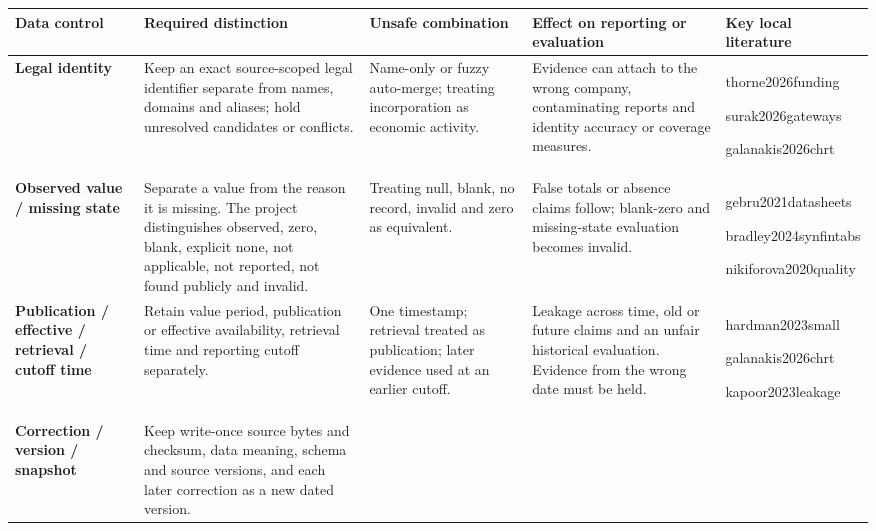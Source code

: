 \clearpage
\begin{table}[p]
  \centering
  \footnotesize
  \setlength{\tabcolsep}{2.2pt}
  \renewcommand{\arraystretch}{1.16}
  \begin{tabularx}{\textwidth}{@{}P{0.15\textwidth}P{0.24\textwidth}P{0.19\textwidth}Y>{\RaggedRight\arraybackslash\scriptsize}p{0.14\textwidth}@{}}
    \toprule
    \textbf{Data control} &
    \textbf{Required distinction} &
    \textbf{Unsafe combination} &
    \textbf{Effect on reporting or evaluation} &
    {\footnotesize\textbf{Key local literature}} \\
    \midrule
    \textbf{Legal identity} &
    Keep an exact source-scoped legal identifier separate from names, domains and aliases; hold unresolved candidates or conflicts. &
    Name-only or fuzzy auto-merge; treating incorporation as economic activity. &
    Evidence can attach to the wrong company, contaminating reports and identity accuracy or coverage measures. &
    thorne2026\allowbreak funding\par surak2026\allowbreak gateways\par galanakis2026\allowbreak chrt \\
    \addlinespace
    \textbf{Observed value / missing state} &
    Separate a value from the reason it is missing. The project distinguishes observed, zero, blank, explicit none, not applicable, not reported, not found publicly and invalid. &
    Treating null, blank, no record, invalid and zero as equivalent. &
    False totals or absence claims follow; blank-zero and missing-state evaluation becomes invalid. &
    gebru2021\allowbreak datasheets\par bradley2024\allowbreak synfintabs\par nikiforova2020\allowbreak quality \\
    \addlinespace
    \textbf{Publication / effective / retrieval / cutoff time} &
    Retain value period, publication or effective availability, retrieval time and reporting cutoff separately. &
    One timestamp; retrieval treated as publication; later evidence used at an earlier cutoff. &
    Leakage across time, old or future claims and an unfair historical evaluation. Evidence from the wrong date must be held. &
    hardman2023\allowbreak small\par galanakis2026\allowbreak chrt\par kapoor2023\allowbreak leakage \\
    \addlinespace
    \textbf{Correction / version / snapshot} &
    Keep write-once source bytes and checksum, data meaning, schema and source versions, and each later correction as a new dated version. &

\end{tabularx}
\end{table}
